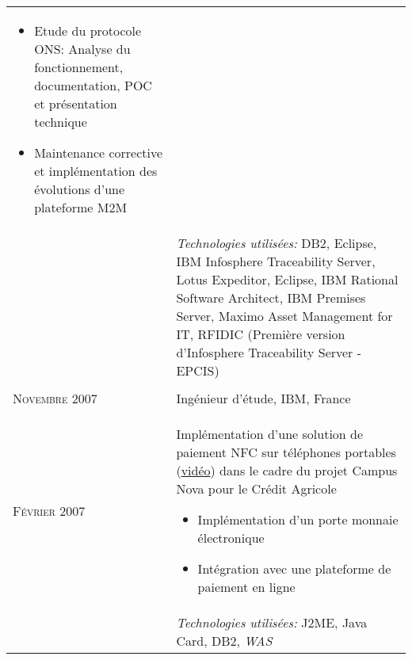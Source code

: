 \begin{longtable}{R{2.5cm}|p{14.8cm}}
{\begin{itemize}
 	 	  \item Etude du protocole ONS: Analyse du fonctionnement, documentation, POC et présentation technique
 	 	  \item Maintenance corrective et implémentation des évolutions d'une plateforme M2M
 		\end{itemize}
 		\vspace{-1em}
 	}\\&
 	\footnotesize{\emph{Technologies utilisées:} DB2, Eclipse, IBM Infosphere Traceability Server, Lotus Expeditor, Eclipse, 
 	IBM Rational Software Architect, IBM Premises Server, Maximo Asset Management for IT, RFIDIC (Première version d'Infosphere Traceability Server - EPCIS) }\\
 \\
 	\textsc{Novembre 2007} & Ingénieur d'étude, \textsc{IBM}, France \\
 	\textsc{Février 2007}&
 	\footnotesize{
 	 	Implémentation d'une solution de paiement NFC sur téléphones portables (\href{http://www.nouvo.ch/s-007}{vidéo}) 
 	 	dans le cadre du projet Campus Nova pour le Crédit Agricole
 	 	\begin{itemize}
 	 	  \item Implémentation d'un porte monnaie électronique
 	 	  \item Intégration avec une plateforme de paiement en ligne
 	 	\end{itemize}
 	 	
	}\\&
	\vspace{-1em}
 	\footnotesize{\emph{Technologies utilisées:} J2ME, Java Card, DB2, \emph{WAS}}\\
\end{longtable}
